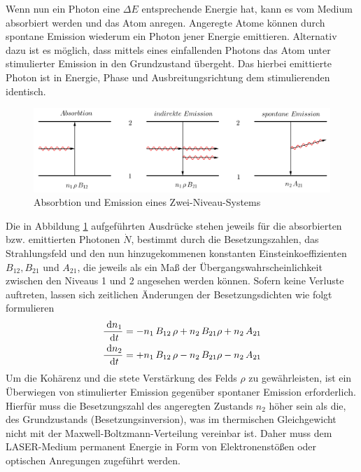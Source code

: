Wenn nun ein Photon eine $\Delta E$ entsprechende Energie hat, kann es vom Medium absorbiert werden und das Atom anregen. 
Angeregte Atome können durch spontane Emission wiederum ein Photon jener Energie emittieren. Alternativ dazu ist es möglich,
dass mittels eines einfallenden Photons das Atom unter stimulierter Emission in den Grundzustand übergeht. Das hierbei
emittierte Photon ist in Energie, Phase und Ausbreitungsrichtung dem stimulierenden identisch. 
\begin{figure}[H]
\includegraphics[width=\textwidth]{../pics/AbsEmi.png}
\caption{Absorbtion und Emission eines Zwei-Niveau-Systems}
\label{pic_AbsEmi}
\end{figure}
Die in Abbildung \ref{pic_AbsEmi} aufgeführten Ausdrücke stehen jeweils für die absorbierten bzw. emittierten Photonen $\dot N$,
bestimmt durch die Besetzungszahlen, das Strahlungsfeld und den nun hinzugekommenen konstanten Einsteinkoeffizienten $B_{12}, B_{21}$ und $A_{21}$, 
die jeweils als ein Maß der Übergangswahrscheinlichkeit zwischen den Niveaus 1 und 2 angesehen werden können. Sofern keine Verluste auftreten, lassen
sich zeitlichen Änderungen der Besetzungsdichten wie folgt formulieren
\begin{align*}
  \frac{\; \mathrm{d} n_1}{\; \mathrm{d} t} = -n_1\, B_{12}\, \rho + n_2\, B_{21} \rho + n_2\, A_{21}\\
  \frac{\; \mathrm{d} n_2}{\; \mathrm{d} t} = +n_1\, B_{12}\, \rho - n_2\, B_{21} \rho - n_2\, A_{21}
\end{align*}
Um die Kohärenz und die stete Verstärkung des Felds $\rho$ zu gewährleisten, ist ein Überwiegen von stimulierter Emission gegenüber spontaner Emission
erforderlich. Hierfür muss die Besetzungszahl des angeregten Zustands $n_2$ höher sein als die, des Grundzustands (Besetzungsinversion), was im thermischen Gleichgewicht
nicht mit der Maxwell-Boltzmann-Verteilung vereinbar ist. Daher muss dem LASER-Medium permanent Energie in Form von Elektronenstößen oder optischen
Anregungen zugeführt werden. 


